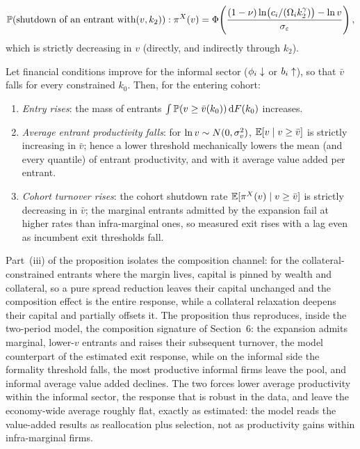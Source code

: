 \documentclass[12pt]{article}
\begin{document}
\begin{equation}
  \mathbb{P}(\text{shutdown of an entrant with} (v,k_{2})):
  \pi^{X}(v)=\Phi\!\left(
  \frac{(1-\nu)\ln\!\big(c_{i}/(\Omega_{i}k_{2}^{\gamma})\big)
        -\ln v}{\sigma_{\varepsilon}}\right),
  \label{eq:toy-shutdown}
\end{equation}
which is strictly decreasing in $v$ (directly, and indirectly through
$k_{2}$).
 
\begin{proposition}
\label{prop:composition}
Let financial conditions improve for the informal sector
($\phi_{i}\downarrow$ or $b_{i}\uparrow$), so that
$\bar v$ falls for every constrained $k_{0}$. Then, for the entering
cohort:
\begin{enumerate}
\item[(i)] \emph{Entry rises}: the mass of entrants
  $\int\mathbb{P}(v\geq\bar v(k_{0}))\,\mathrm{d} F(k_{0})$ increases.
\item[(ii)] \emph{Average entrant productivity falls}: for
  $\ln v\sim N(0,\sigma_{v}^{2})$,
  $\mathbb{E}[v\mid v\geq\bar v]$ is strictly increasing in $\bar v$; hence a
  lower threshold mechanically lowers the mean (and every quantile) of
  entrant productivity, and with it average value added per entrant.
\item[(iii)] \emph{Cohort turnover rises}: the cohort shutdown rate
  $\mathbb{E}[\pi^{X}(v)\mid v\geq\bar v]$ is strictly decreasing in
  $\bar v$; the marginal entrants admitted by the expansion fail at
  higher rates than infra-marginal ones, so measured exit rises with a
  lag even as incumbent exit thresholds fall.
\end{enumerate}
\end{proposition}

Part~(iii) of the proposition isolates the composition channel: for the collateral-constrained entrants where the margin lives, capital is pinned by wealth and collateral, so a pure spread reduction leaves their capital unchanged and the composition effect is the entire response, while a collateral relaxation deepens their capital and partially offsets it. The proposition thus reproduces, inside the two-period model, the composition signature of Section~6: the expansion admits marginal, lower-$v$ entrants and raises their subsequent turnover, the model counterpart of the estimated exit response, while on the informal side the formality threshold falls, the most productive informal firms leave the pool, and informal average value added declines. The two forces lower average productivity within the informal sector, the response that is robust in the data, and leave the economy-wide average roughly flat, exactly as estimated: the model reads the value-added results as reallocation plus selection, not as productivity gains within infra-marginal firms.
 
\end{document}
